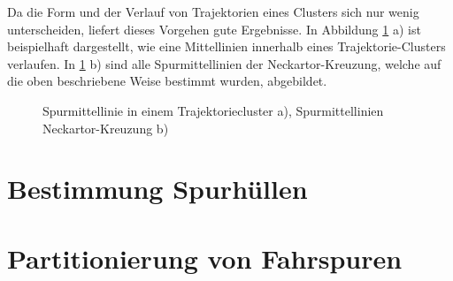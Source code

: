 Da die Form und der Verlauf von Trajektorien eines Clusters sich nur wenig unterscheiden, liefert dieses
Vorgehen gute Ergebnisse. In Abbildung \ref{fig:real2_results_centerline_detection} a) ist beispielhaft
dargestellt, wie eine Mittellinien innerhalb eines Trajektorie-Clusters verlaufen.
In \ref{fig:real2_results_centerline_detection} b) sind alle Spurmittellinien der Neckartor-Kreuzung,
welche auf die oben beschriebene Weise bestimmt wurden, abgebildet.

\begin{figure}[H]
    \centering
    \qquad
    \caption{Spurmittellinie in einem Trajektoriecluster a), Spurmittellinien Neckartor-Kreuzung b)}
    \label{fig:real2_results_centerline_detection}
\end{figure}

\section{Bestimmung Spurhüllen}
\label{sec:real2_define_lane_envelope}



\section{Partitionierung von Fahrspuren}
\label{sec:real2_lane_partitioning}

